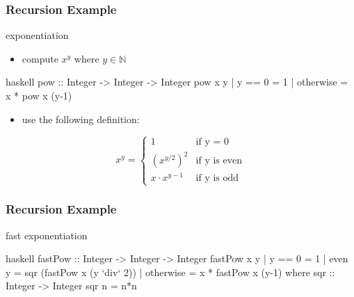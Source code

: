 \documentclass[dvipsnames]{beamer}
\theoremstyle{plain}
\begin{document}
\begin{frame}[fragile]
  \frametitle{Recursion Example}

  \begin{exampleblock}{exponentiation}
    \begin{itemize}
      \item compute $x^y$ where $y \in \mathbb{N}$
    \end{itemize}

    \smallskip
    \begin{pygments}{haskell}
pow :: Integer -> Integer -> Integer
pow x y
  | y == 0    = 1
  | otherwise = x * pow x (y-1)
    \end{pygments}

    \pause
    \begin{itemize}
      \item use the following definition:
    \end{itemize}
    \[
      x^y =
        \begin{cases}
          1               & \mbox{if y = 0}\\
          {(x^{y/2})}^2   & \mbox{if y is even}\\
          x \cdot x^{y-1} & \mbox{if y is odd}
        \end{cases}
    \]
  \end{exampleblock}
\end{frame}

\begin{frame}[fragile]
  \frametitle{Recursion Example}

  \begin{exampleblock}{fast exponentiation}
    \begin{pygments}{haskell}
fastPow :: Integer -> Integer -> Integer
fastPow x y
  | y == 0    = 1
  | even y    = sqr (fastPow x (y `div` 2))
  | otherwise = x * fastPow x (y-1)
  where
    sqr :: Integer -> Integer
    sqr n = n*n
    \end{pygments}
  \end{exampleblock}
\end{frame}
\end{document}
